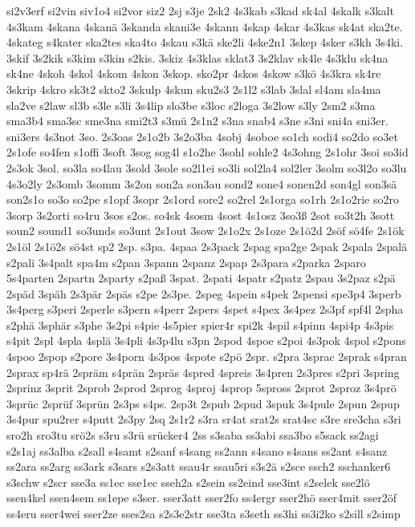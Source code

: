 {si2v3erf
si2vin
siv1o4
si2vor
siz2
2sj
s3je
2sk2
4s3kab
s3kad
sk4al
4skalk
s3kalt
4s3kam
4skana
4skanä
3skanda
skani3e
4skann
4skap
4skar
4s3kas
sk4at
ska2te.
4skateg
s4kater
ska2tes
ska4to
4skau
s3kä
ske2li
4ske2n1
3skep
4sker
s3kh
3s4ki.
3skif
3s2kik
s3kim
s3kin
s2kis.
3skiz
4s3klas
sklat3
3s2klav
sk4le
4s3klu
sk4na
sk4ne
4skoh
4skol
4skom
4skon
3skop.
sko2pr
4skos
4skow
s3kö
4s3kra
sk4re
3skrip
4skro
sk3t2
skto2
3skulp
4skun
sku2s3
2s1l2
s3lab
3slal
sl4am
sla4ma
sla2ve
s2law
sl3b
s3le
s3li
3s4lip
slo3be
s3loc
s2loga
3s2low
s3ly
2sm2
s3ma
sma3b4
sma3sc
sme3na
smi2t3
s3mü
2s1n2
s3na
snab4
s3ne
s3ni
sni4a
sni3er.
sni3ers
4s3not
3so.
2s3oas
2s1o2b
3s2o3ba
4sobj
4soboe
so1ch
sodi4
so2do
so3et
2s1ofe
so4fen
s1offi
3soft
3sog
sog4l
s1o2he
3sohl
sohle2
4s3ohng
2s1ohr
3soi
so3id
2s3ok
3sol.
so3la
so4lau
3sold
3sole
so2l1ei
so3li
sol2la4
sol2ler
3solm
so3l2o
so3lu
4s3o2ly
2s3omb
3somm
3s2on
son2a
son3au
sond2
sone4
sonen2d
son4gl
son3sä
son2s1o
so3o
so2pe
s1opf
3sopr
2s1ord
sore2
so2rel
2s1orga
so1rh
2s1o2rie
so2ro
3sorp
3s2orti
so4ru
3sos
s2os.
so4sk
4sosm
4sost
4s1osz
3so3ß
2sot
so3t2h
3sott
soun2
sound1
so3unds
so3unt
2s1out
3sow
2s1o2x
2s1oze
2s1ö2d
2söf
sö4fe
2s1ök
2s1öl
2s1ö2s
sö4st
sp2
2sp.
s3pa.
4spaa
2s3pack
2spag
spa2ge
2spak
2spala
2spalä
s2pali
3s4palt
spa4m
s2pan
3spann
2spanz
2spap
2s3para
s2parka
2sparo
5s4parten
2spartn
2sparty
s2paß
3spat.
2spati
4spatr
s2patz
2spau
3s2paz
s2pä
2späd
3späh
2s3pär
2späs
s2pe
2s3pe.
2speg
4spein
s4pek
2spensi
spe3p4
3sperb
3s4perg
s3peri
2sperle
s3pern
s4perr
2spers
4spet
s4pex
3s4pez
2s3pf
spf4l
2spha
s2phä
3sphär
s3phe
3s2pi
s4pie
4s5pier
spier4r
spi2k
4spil
s4pinn
4spi4p
4s3pis
s4pit
2spl
4spla
4splä
3s4pli
4s3p4lu
s3pn
2spod
4spoe
s2poi
4s3pok
4spol
s2pons
4spoo
2spop
s2pore
3s4porn
4s3pos
4spote
s2pö
2spr.
s2pra
3sprac
2sprak
s4pran
2sprax
sp4rä
2spräm
s4prän
2spräs
4spred
4spreis
3s4pren
2s3pres
s2pri
3spring
2sprinz
3sprit
2sprob
2sprod
2sprog
4sproj
4sprop
5spross
2sprot
2sproz
3s4prö
3sprüc
2sprüf
3sprün
2s3ps
s4ps.
2sp3t
2spub
2spud
3spuk
3s4pule
2spun
2spup
3s4pur
spu2rer
s4putt
2s3py
2sq
2s1r2
s3ra
sr4at
srat2s
srat4sc
s3re
sre3cha
s3ri
sro2h
sro3tu
srö2s
s3ru
s3rü
srücker4
2ss
s3saba
ss3abi
ssa3bo
s5sack
ss2agi
s2s1aj
ss3alba
s2sall
s4samt
s2sanf
s4sang
ss2ann
s4sano
s4sans
ss2ant
s4sanz
ss2ara
ss2arg
ss3ark
s3sars
s2s3att
ssau4r
ssau5ri
s3s2ä
s2sce
ssch2
sschanker6
s3schw
s2scr
sse3a
ss1ec
sse1ec
sseh2a
s2sein
ss2eind
sse3int
s2selek
sse2lö
ssen4kel
ssen4sem
ss1epe
s3ser.
sser3att
sser2fo
ss4ergr
sser2hö
sser4mit
sser2öf
ss4eru
sser4wei
sser2ze
sses2sa
s2s3e2str
sse3ta
s3seth
ss3hi
ss3i2ko
s2sill
s2simp
}
